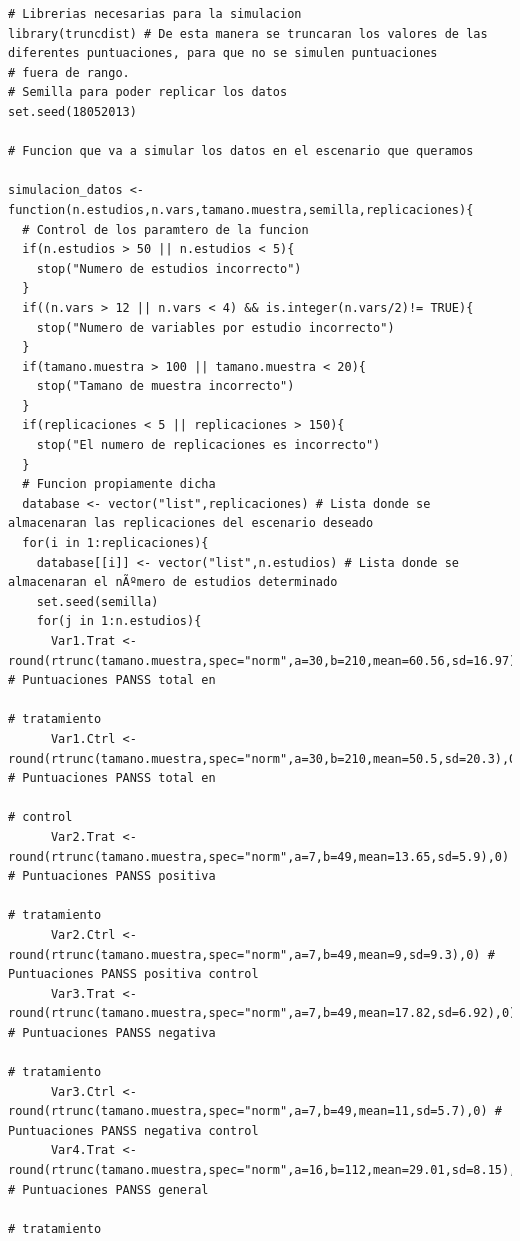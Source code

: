 \documentclass[a4paper,openright,12pt]{report}
\begin{document}
{\begin{verbatim}
# Librerias necesarias para la simulacion
library(truncdist) # De esta manera se truncaran los valores de las diferentes puntuaciones, para que no se simulen puntuaciones
# fuera de rango.
# Semilla para poder replicar los datos
set.seed(18052013)

# Funcion que va a simular los datos en el escenario que queramos

simulacion_datos <- function(n.estudios,n.vars,tamano.muestra,semilla,replicaciones){
  # Control de los paramtero de la funcion
  if(n.estudios > 50 || n.estudios < 5){
    stop("Numero de estudios incorrecto")
  }
  if((n.vars > 12 || n.vars < 4) && is.integer(n.vars/2)!= TRUE){
    stop("Numero de variables por estudio incorrecto")
  }
  if(tamano.muestra > 100 || tamano.muestra < 20){
    stop("Tamano de muestra incorrecto")
  }
  if(replicaciones < 5 || replicaciones > 150){
    stop("El numero de replicaciones es incorrecto")
  }
  # Funcion propiamente dicha
  database <- vector("list",replicaciones) # Lista donde se almacenaran las replicaciones del escenario deseado
  for(i in 1:replicaciones){
    database[[i]] <- vector("list",n.estudios) # Lista donde se almacenaran el nÃºmero de estudios determinado
    set.seed(semilla)
    for(j in 1:n.estudios){
      Var1.Trat <- round(rtrunc(tamano.muestra,spec="norm",a=30,b=210,mean=60.56,sd=16.97),0) # Puntuaciones PANSS total en 
                                                                                              # tratamiento
      Var1.Ctrl <- round(rtrunc(tamano.muestra,spec="norm",a=30,b=210,mean=50.5,sd=20.3),0) # Puntuaciones PANSS total en 
                                                                                            # control
      Var2.Trat <- round(rtrunc(tamano.muestra,spec="norm",a=7,b=49,mean=13.65,sd=5.9),0) # Puntuaciones PANSS positiva 
                                                                                          # tratamiento
      Var2.Ctrl <- round(rtrunc(tamano.muestra,spec="norm",a=7,b=49,mean=9,sd=9.3),0) # Puntuaciones PANSS positiva control
      Var3.Trat <- round(rtrunc(tamano.muestra,spec="norm",a=7,b=49,mean=17.82,sd=6.92),0) # Puntuaciones PANSS negativa 
                                                                                           # tratamiento
      Var3.Ctrl <- round(rtrunc(tamano.muestra,spec="norm",a=7,b=49,mean=11,sd=5.7),0) # Puntuaciones PANSS negativa control
      Var4.Trat <- round(rtrunc(tamano.muestra,spec="norm",a=16,b=112,mean=29.01,sd=8.15),0) # Puntuaciones PANSS general 
                                                                                             # tratamiento

\end{verbatim}}
\end{document}
